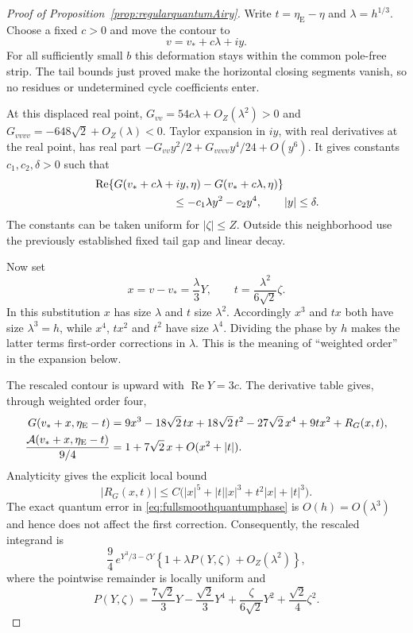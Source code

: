 \begin{proof}[Proof of Proposition~\ref{prop:regularquantumAiry}]
Write $t=\eta_{\mathrm E}-\eta$ and $\lambda=h^{1/3}$.
Choose a fixed $c>0$ and move the contour to
\[
 v=v_*+c\lambda+iy.
\]
For all sufficiently small $b$ this deformation stays within
the common pole-free strip. The tail bounds just proved make
the horizontal closing segments vanish, so no residues or
undetermined cycle coefficients enter.

At this displaced real point,
$G_{vv}=54c\lambda+O_Z(\lambda^2)>0$ and
$G_{vvvv}=-648\sqrt2+O_Z(\lambda)<0$.
Taylor expansion in $iy$, with real derivatives at the real
point, has real part
$-G_{vv}y^2/2+G_{vvvv}y^4/24+O(y^6)$. It gives constants
$c_1,c_2,\delta>0$ such that
\begin{equation}
 \begin{split}
 &\operatorname{Re}\{G(v_*+c\lambda+iy,\eta)
                     -G(v_*+c\lambda,\eta)\}\\
 &\hspace{25mm}\le -c_1\lambda y^2-c_2y^4,
       \qquad |y|\le\delta.
 \end{split}
 \label{eq:AiryGaussianbound}
\end{equation}
The constants can be taken uniform for $|\zeta|\le Z$.
Outside this neighborhood use the previously established
fixed tail gap and linear decay.

Now set
\[
 x=v-v_*=\frac{\lambda}{3}Y,\qquad
 t=\frac{\lambda^2}{6\sqrt2}\zeta.
\]
In this substitution $x$ has size $\lambda$ and $t$ size
$\lambda^2$. Accordingly $x^3$ and $tx$ both have size
$\lambda^3=h$, while $x^4$, $tx^2$ and $t^2$ have size
$\lambda^4$. Dividing the phase by $h$ makes the latter terms
first-order corrections in $\lambda$. This is the meaning of
``weighted order'' in the expansion below.

The rescaled contour is upward with $\operatorname{Re}Y=3c$.
The derivative table gives, through weighted order four,
\begin{align}
 G(v_*+x,\eta_{\mathrm E}-t)
 &=9x^3-18\sqrt2\,tx
   +18\sqrt2\,t^2-27\sqrt2\,x^4+9tx^2
   +R_G(x,t),\notag\\
 \frac{\mathcal A(v_*+x,\eta_{\mathrm E}-t)}{9/4}
 &=1+7\sqrt2\,x+O(x^2+|t|).
 \label{eq:Airyweightedexpansion}
\end{align}
Analyticity gives the explicit local bound
\[
 |R_G(x,t)|\le C\bigl(|x|^5+|t||x|^3+t^2|x|+|t|^3\bigr).
\]
The exact quantum error in
\eqref{eq:fullsmoothquantumphase} is $O(h)=O(\lambda^3)$
and hence does not affect the first correction.
Consequently, the rescaled integrand is
\begin{equation}
 \frac94\,e^{Y^3/3-\zeta Y}
 \left\{1+\lambda P(Y,\zeta)+O_Z(\lambda^2)\right\},
 \label{eq:Airyscaledquantum}
\end{equation}
where the pointwise remainder is locally uniform and
\begin{equation}
 P(Y,\zeta)=
 \frac{7\sqrt2}{3}Y-\frac{\sqrt2}{3}Y^4
 +\frac{\zeta}{6\sqrt2}Y^2
 +\frac{\sqrt2}{4}\zeta^2.
 \label{eq:Airycorrectionpolynomial}
\end{equation}


\end{proof}
